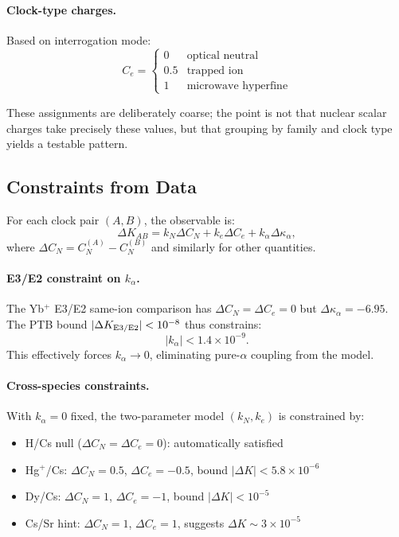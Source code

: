 \paragraph{Clock-type charges.}
Based on interrogation mode:
\begin{equation}
C_e = \begin{cases}
0 & \text{optical neutral} \\
0.5 & \text{trapped ion} \\
1 & \text{microwave hyperfine}
\end{cases}
\end{equation}

These assignments are deliberately coarse; the point is not that nuclear 
scalar charges take precisely these values, but that grouping by family 
and clock type yields a testable pattern.

\subsection{Constraints from Data}\label{app:fc-constraints}

For each clock pair $(A, B)$, the observable is:
\begin{equation}
\Delta K_{AB} = k_N \Delta C_N + k_e \Delta C_e + k_\alpha \Delta\kappa_\alpha,
\end{equation}
where $\Delta C_N = C_N^{(A)} - C_N^{(B)}$ and similarly for other quantities.

\paragraph{E3/E2 constraint on $k_\alpha$.}
The Yb$^+$ E3/E2 same-ion comparison has $\Delta C_N = \Delta C_e = 0$ but 
$\Delta\kappa_\alpha = -6.95$. The PTB bound $|\Delta K_{\rm E3/E2}| < 10^{-8}$ 
thus constrains:
\begin{equation}
|k_\alpha| < 1.4 \times 10^{-9}.
\end{equation}
This effectively forces $k_\alpha \to 0$, eliminating pure-$\alpha$ 
coupling from the model.

\paragraph{Cross-species constraints.}
With $k_\alpha = 0$ fixed, the two-parameter model $(k_N, k_e)$ is 
constrained by:
\begin{itemize}
\item H/Cs null ($\Delta C_N = \Delta C_e = 0$): automatically satisfied
\item Hg$^+$/Cs: $\Delta C_N = 0.5$, $\Delta C_e = -0.5$, bound $|\Delta K| < 5.8 \times 10^{-6}$
\item Dy/Cs: $\Delta C_N = 1$, $\Delta C_e = -1$, bound $|\Delta K| < 10^{-5}$
\item Cs/Sr hint: $\Delta C_N = 1$, $\Delta C_e = 1$, suggests $\Delta K \sim 3 \times 10^{-5}$
\end{itemize}

